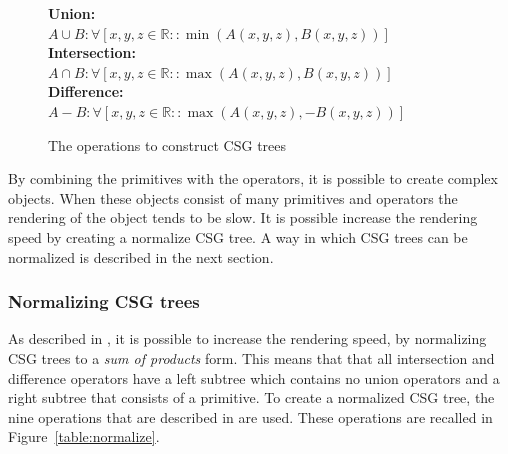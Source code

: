 \documentclass[a4paper,10pt,twocolumn]{article}
\begin{document}
    \begin{figure}[h]
        {\fontsize{8.7}{10}\selectfont
        \textbf{Union:}\\
        $A \cup B: \forall[x,y,z \in \mathbb{R} :: \min(A(x, y, z), B(x, y, z))]$ \\

        \textbf{Intersection:}\\
        $A \cap B: \forall[x,y,z \in \mathbb{R} :: \max(A(x, y, z), B(x, y, z))]$ \\

        \textbf{Difference:}\\
        $A - B: \forall[x,y,z \in \mathbb{R} :: \max(A(x, y, z), -B(x, y, z))]$
        }
        \caption{The operations to construct CSG trees}
        \label{figure:operations}
    \end{figure}

    By combining the primitives with the operators, it is possible to create complex objects. When these objects consist of many primitives and operators the rendering of the object tends to be slow. It is possible increase the rendering speed by creating a normalize CSG tree. A way in which CSG trees can be normalized is described in the next section.

\subsubsection{Normalizing CSG trees}
    As described in \cite{Wiegand96}, it is possible to increase the rendering speed, by normalizing CSG trees to a \textit{sum of products} form. This means that that all intersection and difference operators have a left subtree which contains no union operators and a right subtree that consists of a primitive. To create a normalized CSG tree, the nine operations that are described in \cite{Wiegand96} are used. These operations are recalled in Figure~\ref{table:normalize}.
\end{document}
